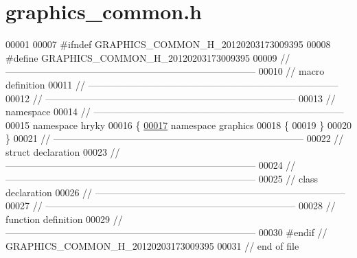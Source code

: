 \hypertarget{graphics__common_8h_source}{\section{graphics\-\_\-common.\-h}
}

\begin{DoxyCode}
00001 
00007 \textcolor{preprocessor}{#ifndef GRAPHICS\_COMMON\_H\_20120203173009395}
00008 \textcolor{preprocessor}{}\textcolor{preprocessor}{#define GRAPHICS\_COMMON\_H\_20120203173009395}
00009 \textcolor{preprocessor}{}\textcolor{comment}{//
      ------------------------------------------------------------------------------}
00010 \textcolor{comment}{// macro definition}
00011 \textcolor{comment}{//
      ------------------------------------------------------------------------------}
00012 \textcolor{comment}{//
      ------------------------------------------------------------------------------}
00013 \textcolor{comment}{// namespace}
00014 \textcolor{comment}{//
      ------------------------------------------------------------------------------}
00015 \textcolor{keyword}{namespace }hryky
00016 \{
\hypertarget{graphics__common_8h_source_l00017}{}\hyperlink{namespacehryky_1_1graphics}{00017} \textcolor{keyword}{namespace }graphics
00018 \{
00019 \}
00020 \}
00021 \textcolor{comment}{//
      ------------------------------------------------------------------------------}
00022 \textcolor{comment}{// struct declaration}
00023 \textcolor{comment}{//
      ------------------------------------------------------------------------------}
00024 \textcolor{comment}{//
      ------------------------------------------------------------------------------}
00025 \textcolor{comment}{// class declaration}
00026 \textcolor{comment}{//
      ------------------------------------------------------------------------------}
00027 \textcolor{comment}{//
      ------------------------------------------------------------------------------}
00028 \textcolor{comment}{// function definition}
00029 \textcolor{comment}{//
      ------------------------------------------------------------------------------}
00030 \textcolor{preprocessor}{#endif // GRAPHICS\_COMMON\_H\_20120203173009395}
00031 \textcolor{preprocessor}{}\textcolor{comment}{// end of file}
\end{DoxyCode}
